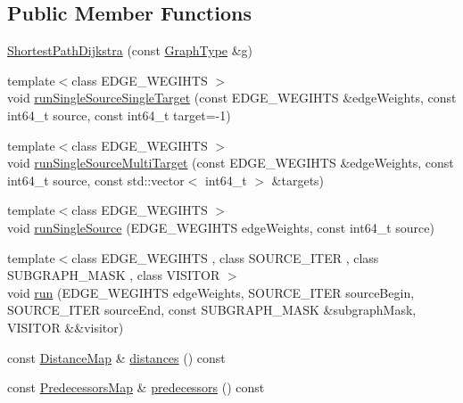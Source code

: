 \subsection*{Public Member Functions}
\begin{DoxyCompactItemize}
\item 
\hyperlink{classnifty_1_1graph_1_1ShortestPathDijkstra_a4ac2678953bd864c66d86b1c0b624d8b}{Shortest\+Path\+Dijkstra} (const \hyperlink{classnifty_1_1graph_1_1ShortestPathDijkstra_ab811998d24996c29b2ba613d9604b800}{Graph\+Type} \&g)
\item 
{\footnotesize template$<$class E\+D\+G\+E\+\_\+\+W\+E\+G\+I\+H\+TS $>$ }\\void \hyperlink{classnifty_1_1graph_1_1ShortestPathDijkstra_ab199118e6b805700d5330563401fe39d}{run\+Single\+Source\+Single\+Target} (const E\+D\+G\+E\+\_\+\+W\+E\+G\+I\+H\+TS \&edge\+Weights, const int64\+\_\+t source, const int64\+\_\+t target=-\/1)
\item 
{\footnotesize template$<$class E\+D\+G\+E\+\_\+\+W\+E\+G\+I\+H\+TS $>$ }\\void \hyperlink{classnifty_1_1graph_1_1ShortestPathDijkstra_ac73da5c1ffcd7367ae159264895cc1fc}{run\+Single\+Source\+Multi\+Target} (const E\+D\+G\+E\+\_\+\+W\+E\+G\+I\+H\+TS \&edge\+Weights, const int64\+\_\+t source, const std\+::vector$<$ int64\+\_\+t $>$ \&targets)
\item 
{\footnotesize template$<$class E\+D\+G\+E\+\_\+\+W\+E\+G\+I\+H\+TS $>$ }\\void \hyperlink{classnifty_1_1graph_1_1ShortestPathDijkstra_ad5f769f5a2acc76b6b0e8914cafd1eb1}{run\+Single\+Source} (E\+D\+G\+E\+\_\+\+W\+E\+G\+I\+H\+TS edge\+Weights, const int64\+\_\+t source)
\item 
{\footnotesize template$<$class E\+D\+G\+E\+\_\+\+W\+E\+G\+I\+H\+TS , class S\+O\+U\+R\+C\+E\+\_\+\+I\+T\+ER , class S\+U\+B\+G\+R\+A\+P\+H\+\_\+\+M\+A\+SK , class V\+I\+S\+I\+T\+OR $>$ }\\void \hyperlink{classnifty_1_1graph_1_1ShortestPathDijkstra_a3772fbcff8a5baa69b3884e69849380d}{run} (E\+D\+G\+E\+\_\+\+W\+E\+G\+I\+H\+TS edge\+Weights, S\+O\+U\+R\+C\+E\+\_\+\+I\+T\+ER source\+Begin, S\+O\+U\+R\+C\+E\+\_\+\+I\+T\+ER source\+End, const S\+U\+B\+G\+R\+A\+P\+H\+\_\+\+M\+A\+SK \&subgraph\+Mask, V\+I\+S\+I\+T\+OR \&\&visitor)
\item 
const \hyperlink{classnifty_1_1graph_1_1ShortestPathDijkstra_a7fd5b5d4bd9b9a6b9e8812b2c184c18a}{Distance\+Map} \& \hyperlink{classnifty_1_1graph_1_1ShortestPathDijkstra_a4e312b4ec1ecaddb21c5b5e14049ead8}{distances} () const
\item 
const \hyperlink{classnifty_1_1graph_1_1ShortestPathDijkstra_a87227c1cb37963c6a826889c693ab906}{Predecessors\+Map} \& \hyperlink{classnifty_1_1graph_1_1ShortestPathDijkstra_af00403d368fb8128d37a8bc736631245}{predecessors} () const
\end{DoxyCompactItemize}



